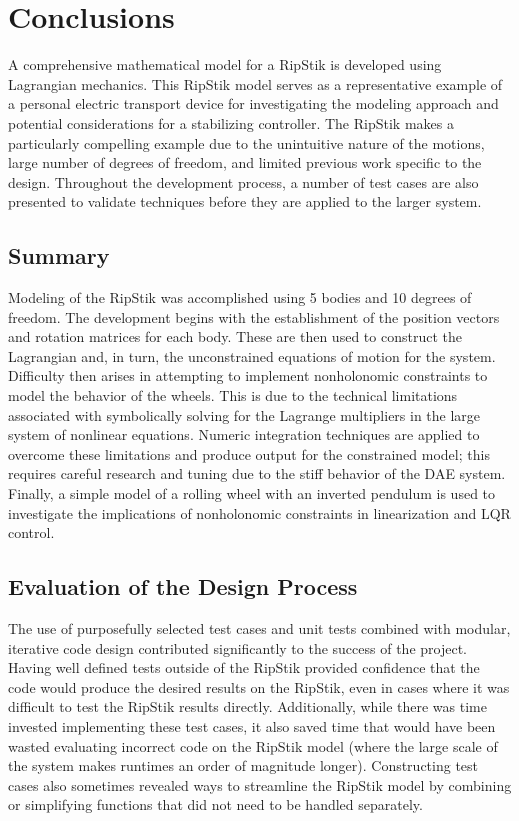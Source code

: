 \section{Conclusions}
A comprehensive mathematical model for a RipStik is developed using Lagrangian mechanics.
This RipStik model serves as a representative example of a personal electric transport device for investigating the modeling approach and potential considerations for a stabilizing controller. 
The RipStik makes a particularly compelling example due to the unintuitive nature of the motions, large number of degrees of freedom, and limited previous work specific to the design.
Throughout the development process, a number of test cases are also presented to validate techniques before they are applied to the larger system. 
\subsection{Summary}
Modeling of the RipStik was accomplished using 5 bodies and 10 degrees of freedom.
The development begins with the establishment of the position vectors and rotation matrices for each body.
These are then used to construct the Lagrangian and, in turn, the unconstrained equations of motion for the system.
Difficulty then arises in attempting to implement nonholonomic constraints to model the behavior of the wheels.
This is due to the technical limitations associated with symbolically solving for the Lagrange multipliers in the large system of nonlinear equations. 
Numeric integration techniques are applied to overcome these limitations and produce output for the constrained model; this requires careful research and tuning due to the stiff behavior of the DAE system.
Finally, a simple model of a rolling wheel with an inverted pendulum is used to investigate the implications of nonholonomic constraints in linearization and LQR control.
\subsection{Evaluation of the Design Process}
The use of purposefully selected test cases and unit tests combined with modular, iterative code design contributed significantly to the success of the project. 
Having well defined tests outside of the RipStik provided confidence that the code would produce the desired results on the RipStik, even in cases where it was difficult to test the RipStik results directly. 
Additionally, while there was time invested implementing these test cases, it also saved time that would have been wasted evaluating incorrect code on the RipStik model (where the large scale of the system makes runtimes an order of magnitude longer). 
Constructing test cases also sometimes revealed ways to streamline the RipStik model by combining or simplifying functions that did not need to be handled separately.

